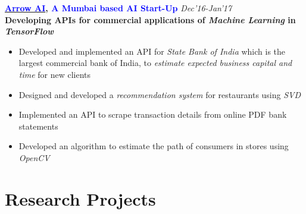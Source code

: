 \documentclass[margin,line]{res}
\begin{document}
\begin{resume}
{\bf \href{http://arrowai.com}{\textcolor{blue} {Arrow AI}}, {\textcolor{blue}{A Mumbai based AI Start-Up}}}  \hfill {\it Dec'16-Jan'17} \\
\textbf{Developing APIs for commercial applications of \emph{Machine Learning} in \emph{TensorFlow}}\\
\vspace*{-.1in}
\begin{itemize}
\item Developed and implemented an API for \emph{State Bank of India} which is the largest commercial bank of India, to \emph{estimate expected business capital and time} for new clients
\item Designed and developed a \emph{recommendation system} for restaurants using \emph{SVD}
\item Implemented an API to scrape transaction details from online PDF bank statements
\item Developed an algorithm to estimate the path of consumers in stores using \emph{OpenCV} 
\end{itemize}




\section{\sc Research Projects}


\end{resume}
\end{document}
